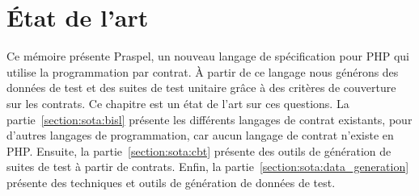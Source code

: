 \chapter{État de l'art}
\label{chapter:state}

\mminitoc

Ce mémoire présente Praspel, un nouveau langage de spécification pour PHP qui
utilise la programmation par contrat. À partir de ce langage nous générons des
données de test et des suites de test unitaire grâce à des critères de
couverture sur les contrats. Ce chapitre est un état de l'art sur ces questions.
La partie~\ref{section:sota:bisl} présente les différents langages de contrat
existants, pour d'autres langages de programmation, car aucun langage de contrat
n'existe en PHP. Ensuite, la partie~\ref{section:sota:cbt} présente des outils
de génération de suites de test à partir de contrats. Enfin, la
partie~\ref{section:sota:data_generation} présente des techniques et outils de
génération de données de test.

